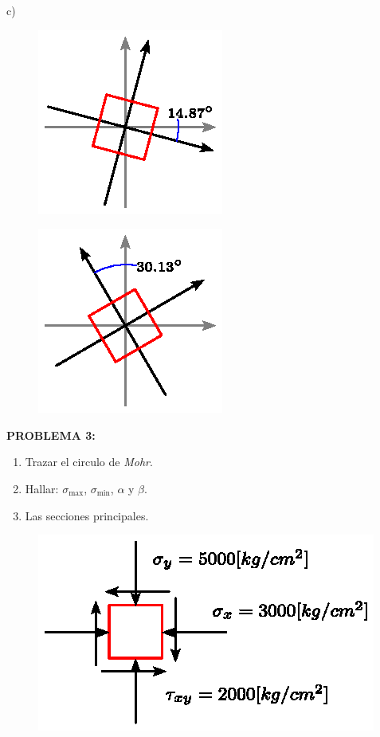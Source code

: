\documentclass[letter,10pt,twoside]{article}
\begin{document}
c) 

\begin{figure}[H]
\centering
\includegraphics[scale=1.6]{resources/f22.eps}
\end{figure}

\begin{figure}[H]
\centering
\includegraphics[scale=1.6]{resources/f23.eps}
\end{figure}

\newpage

\colorbox{blue!25}{\textbf{PROBLEMA 3:}}

\begin{enumerate}[label=\alph*)]
    \item Trazar el circulo de \emph{Mohr}.
    \item Hallar: $\sigma_{\text{max}}$, $\sigma_{\text{min}}$, $\alpha$ y
        $\beta$.
    \item Las secciones principales.
\end{enumerate}

\begin{figure}[H]
\centering
\includegraphics[scale=1.2]{resources/f30.eps}
\end{figure}
\end{document}
